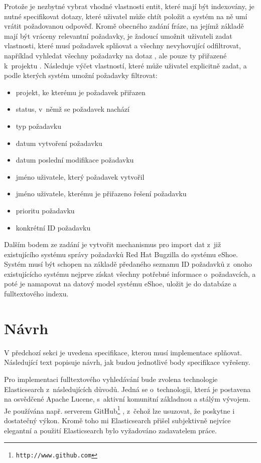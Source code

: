 \documentclass[11pt,oneside]{fithesis2}
\begin{document}
Protože je nezbytné vybrat vhodné vlastnosti entit, které mají být indexovány, je nutné specifikovat dotazy, které uživatel může chtít položit a systém na ně umí vrátit požadovanou odpověď. Kromě obecného zadání fráze, na jejímž základě mají být vráceny relevantní požadavky, je žadoucí umožnit uživateli zadat vlastnosti, které musí požadavek splňovat a všechny nevyhovující odfiltrovat, například vyhledat všechny požadavky na dotaz , ale pouze ty přiřazené k~projektu . Následuje výčet vlastností, které může uživatel explicitně zadat, a podle kterých systém umožní požadavky filtrovat:
\begin{itemize}
	\item projekt, ke kterému je požadavek přiřazen
	\item status, v~němž se požadavek nachází
	\item typ požadavku
	\item datum vytvoření požadavku
	\item datum poslední modifikace požadavku
	\item jméno uživatele, který požadavek vytvořil
	\item jméno uživatele, kterému je přiřazeno řešení požadavku
	\item prioritu požadavku
	\item konkrétní ID požadavku	 
\end{itemize}

Dalším bodem ze zadání je vytvořit mechanismus pro import dat z~již existujícího systému správy požadavků Red Hat Bugzilla do systému eShoe. Systém musí být schopen na základě předaného seznamu ID požadavků z~onoho existujícícho systému nejprve získat všechny potřebné informace o~požadavcích, a poté je namapovat na datový model systému eShoe, uložit je do databáze a fulltextového indexu. 

\newpage

\section{Návrh}
V předchozí sekci je uvedena specifikace, kterou musí implementace splňovat. Následující text popisuje návrh, jak budou jednotlivé body specifikace vyřešeny. 

Pro implementaci fulltextového vyhledávání bude zvolena technologie Elasticsearch z~následujících důvodů. Jedná se o~technologii, která je postavena na osvědčené Apache Lucene, s~aktivní komunitní základnou a stálým vývojem. Je používána např. serverem GitHub\footnote{\texttt{http://www.github.com}} \cite{ElasticsearchDefinitiveGuide}, z~čehož lze usuzovat, že poskytne i dostatečný výkon. Kromě toho mi Elasticsearch přišel subjektivně nejvíce elegantní a použití Elasticsearch bylo vyžadováno zadavatelem práce.
\end{document}
